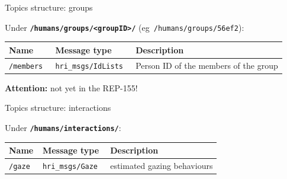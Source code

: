\documentclass[xcolor=table,aspectratio=169]{beamer}
\begin{document}
\begin{frame}{Topics structure: groups}

    Under \textbf{\texttt{/humans/groups/<groupID>/}} (eg~\texttt{/humans/groups/56ef2}):

    \scriptsize
    \begin{tabular}{@{}p{2.5cm}p{4.5cm}p{6cm}@{}}
        \toprule
        \textbf{Name} & \textbf{Message type}         & \textbf{Description}                                                \\ \midrule
        \texttt{/members                } & \texttt{hri\_msgs/IdLists         }  & Person ID of the members of the group  \\
\bottomrule
\end{tabular}

    \vspace{1em}\textbf{Attention:} not yet in the REP-155!
    
\end{frame}

\begin{frame}{Topics structure: interactions}

    Under \textbf{\texttt{/humans/interactions/}}:

    \scriptsize
    \begin{tabular}{@{}p{2.5cm}p{4.5cm}p{6cm}@{}}
        \toprule
        \textbf{Name} & \textbf{Message type}         & \textbf{Description}                                                \\ \midrule
        \texttt{/gaze    } & \texttt{hri\_msgs/Gaze         }  & estimated gazing behaviours    \\
\bottomrule
\end{tabular}
    
\end{frame}
\end{document}
